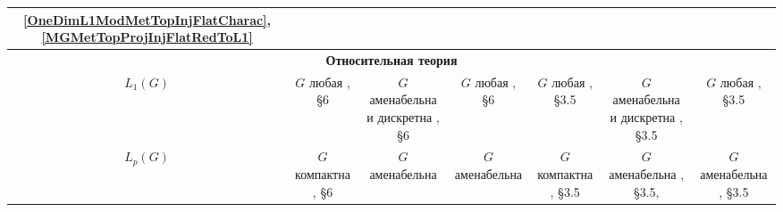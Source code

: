 \documentclass{article}
\numberwithin{equation}{section}
\theoremstyle{plain}
\theoremstyle{definition}
\begin{document}
\begin{fulltext}
\begin{table}[ht]
\begin{tiny}
{\begin{tabular}{|c|c|c|c|c|c|c|}
{                   {\ref{OneDimL1ModMetTopInjFlatCharac}},
                   {\ref{MGMetTopProjInjFlatRedToL1}}
                } \\ 
            \hline
                \multicolumn{7}{c}{\textbf{Относительная теория}} \\
            \hline
                $L_1(G)$ & 
                \shortstack{
                    $G$ любая \\
					{\cite{DalPolHomolPropGrAlg}, \S 6}
                } & 
                \shortstack{
                    $G$ аменабельна \\  и дискретна \\
					{\cite{DalPolHomolPropGrAlg}, \S 6}
                } & 
                \shortstack{
                    $G$ любая \\
					{\cite{DalPolHomolPropGrAlg}, \S 6}
                } & 
                \shortstack{
                    $G$ любая \\
					{\cite{RamsHomPropSemgroupAlg}, \S 3.5}
                } & 
                \shortstack{
                    $G$ аменабельна \\  и дискретна \\
					{\cite{RamsHomPropSemgroupAlg}, \S 3.5}
                } & 
                \shortstack{
                    $G$ любая \\
					{\cite{RamsHomPropSemgroupAlg}, \S 3.5}
                } \\ 
            \hline
                $L_p(G)$ & 
                \shortstack{
                    $G$ компактна \\
					{\cite{DalPolHomolPropGrAlg}, \S 6}
                } & 
                \shortstack{
                    $G$ аменабельна \\
					{\cite{RachInjModAndAmenGr}}
                } & 
                \shortstack{
                    $G$ аменабельна \\
					{\cite{RachInjModAndAmenGr}}
                } & 
                \shortstack{
                    $G$ компактна \\
					{\cite{RamsHomPropSemgroupAlg}, \S 3.5}
                } & 
                \shortstack{
                    $G$ аменабельна \\
					{\cite{RamsHomPropSemgroupAlg}, \S 3.5,
					{\cite{RachInjModAndAmenGr}}}
                } & 
                \shortstack{
                    $G$ аменабельна \\
					{\cite{RamsHomPropSemgroupAlg}, \S 3.5}
                } \\

\end{tabular}}
\end{tiny}
\end{table}
\end{fulltext}
\end{document}
